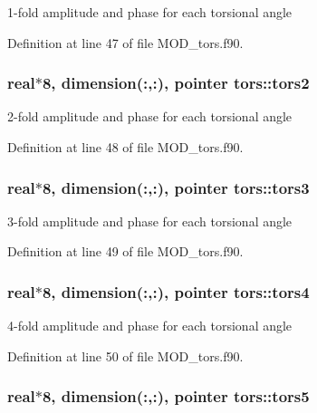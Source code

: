 1-\/fold amplitude and phase for each torsional angle 



Definition at line 47 of file M\-O\-D\-\_\-tors.\-f90.

\hypertarget{classtors_a6690f8463e3e2a846d7f58761fc911ad}{
\subsubsection[{tors2}]{\setlength{\rightskip}{0pt plus 5cm}real$\ast$8, dimension(\-:,\-:), pointer tors\-::tors2}}\label{classtors_a6690f8463e3e2a846d7f58761fc911ad}


2-\/fold amplitude and phase for each torsional angle 



Definition at line 48 of file M\-O\-D\-\_\-tors.\-f90.

\hypertarget{classtors_a98589f236939f86f0aec2b1b1542dc9c}{
\subsubsection[{tors3}]{\setlength{\rightskip}{0pt plus 5cm}real$\ast$8, dimension(\-:,\-:), pointer tors\-::tors3}}\label{classtors_a98589f236939f86f0aec2b1b1542dc9c}


3-\/fold amplitude and phase for each torsional angle 



Definition at line 49 of file M\-O\-D\-\_\-tors.\-f90.

\hypertarget{classtors_a664bbbab92d62df9a1d67b1e47a467d0}{
\subsubsection[{tors4}]{\setlength{\rightskip}{0pt plus 5cm}real$\ast$8, dimension(\-:,\-:), pointer tors\-::tors4}}\label{classtors_a664bbbab92d62df9a1d67b1e47a467d0}


4-\/fold amplitude and phase for each torsional angle 



Definition at line 50 of file M\-O\-D\-\_\-tors.\-f90.

\hypertarget{classtors_a021bb0ab8d8f43957a38462ce7ce95fb}{
\subsubsection[{tors5}]{\setlength{\rightskip}{0pt plus 5cm}real$\ast$8, dimension(\-:,\-:), pointer tors\-::tors5}}\label{classtors_a021bb0ab8d8f43957a38462ce7ce95fb}


